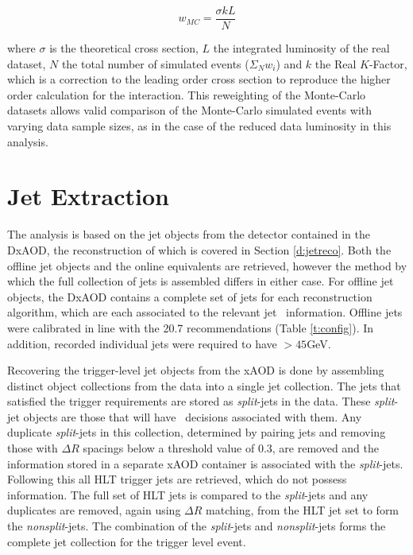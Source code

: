		 \begin{equation}
		 w_{MC} = \frac{\sigma k L}{N}
		 \end{equation}

		 where $\sigma$ is the theoretical cross section, $L$ the integrated luminosity of the real dataset, $N$ the total number of simulated events ($\Sigma_N w_i$) and $k$ the Real $K$-Factor, which is a correction to the leading order cross section to reproduce the higher order calculation for the interaction. This reweighting of the Monte-Carlo datasets allows valid comparison of the Monte-Carlo simulated events with varying data sample sizes, as in the case of the reduced data luminosity in this analysis.


	\section{Jet Extraction}

		The analysis is based on the jet objects from the detector contained in the DxAOD, the reconstruction of which is covered in Section \ref{d:jetreco}. Both the offline jet objects and the online equivalents are retrieved, however the method by which the full collection of jets is assembled differs in either case. For offline jet objects, the DxAOD contains a complete set of jets for each reconstruction algorithm, which are each associated to the relevant jet \btag\, information. Offline jets were calibrated in line with the 20.7 recommendations (Table \ref{t:config}). In addition, recorded individual jets were required to have \pt$>45$GeV.

		Recovering the trigger-level jet objects from the xAOD is done by assembling distinct object collections from the data into a single jet collection. The jets that satisfied the trigger requirements are stored as \textit{split}-jets in the data. These \textit{split}-jet objects are those that will have \btag\ decisions associated with them. Any duplicate \textit{split}-jets in this collection, determined by pairing jets and removing those with $\Delta R$ spacings below a threshold value of 0.3, are removed and the \btag\, information stored in a separate xAOD container is associated with the \textit{split}-jets. Following this all HLT trigger jets are retrieved, which do not possess \btag\, information. The full set of HLT jets is compared to the \textit{split}-jets and any duplicates are removed, again using $\Delta R$ matching, from the HLT jet set to form the \textit{nonsplit}-jets. The combination of the \textit{split}-jets and \textit{nonsplit}-jets forms the complete jet collection for the trigger level event.

